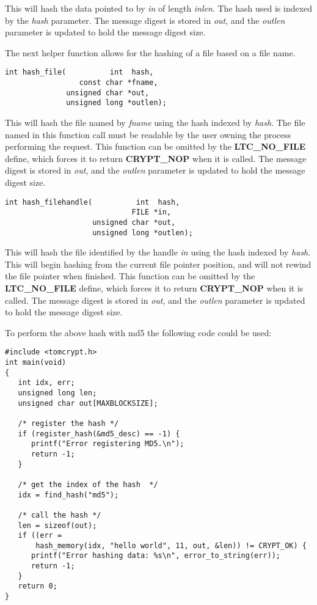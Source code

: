 \documentclass[synpaper]{book}
\begin{document}
This will hash the data pointed to by \textit{in} of length \textit{inlen}.  The hash used is indexed by the \textit{hash} parameter.  The message
digest is stored in \textit{out}, and the \textit{outlen} parameter is updated to hold the message digest size.

The next helper function allows for the hashing of a file based on a file name.
\begin{verbatim}
int hash_file(          int  hash,
                 const char *fname,
              unsigned char *out,
              unsigned long *outlen);
\end{verbatim}

This will hash the file named by \textit{fname} using the hash indexed by \textit{hash}.  The file named in this function call must be readable by the
user owning the process performing the request.  This function can be omitted by the \textbf{LTC\_NO\_FILE} define, which forces it to return \textbf{CRYPT\_NOP}
when it is called.  The message digest is stored in \textit{out}, and the \textit{outlen} parameter is updated to hold the message digest size.

\begin{verbatim}
int hash_filehandle(          int  hash,
                             FILE *in,
                    unsigned char *out,
                    unsigned long *outlen);
\end{verbatim}

This will hash the file identified by the handle \textit{in} using the hash indexed by \textit{hash}.  This will begin hashing from the current file pointer position, and
will not rewind the file pointer when finished.  This function can be omitted by the \textbf{LTC\_NO\_FILE} define, which forces it to return \textbf{CRYPT\_NOP}
when it is called.  The message digest is stored in \textit{out}, and the \textit{outlen} parameter is updated to hold the message digest size.

To perform the above hash with md5 the following code could be used:
\begin{small}
\begin{verbatim}
#include <tomcrypt.h>
int main(void)
{
   int idx, err;
   unsigned long len;
   unsigned char out[MAXBLOCKSIZE];

   /* register the hash */
   if (register_hash(&md5_desc) == -1) {
      printf("Error registering MD5.\n");
      return -1;
   }

   /* get the index of the hash  */
   idx = find_hash("md5");

   /* call the hash */
   len = sizeof(out);
   if ((err =
       hash_memory(idx, "hello world", 11, out, &len)) != CRYPT_OK) {
      printf("Error hashing data: %s\n", error_to_string(err));
      return -1;
   }
   return 0;
}
\end{verbatim}
\end{small}
\end{document}

